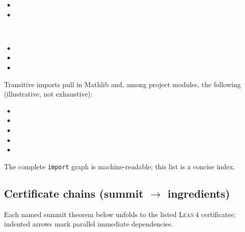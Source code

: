 \documentclass[11pt,a4paper]{article}
\theoremstyle{definition}
\newcommand{\lean}{\textsc{Lean}\,4}
\begin{document}
\begin{description}[style=nextline, font=\normalfont\ttfamily\small]
\begin{itemize}[leftmargin=1.5em,itemsep=0.12em,nosep]
\item {}
\item {}
\end{itemize}
\item[Summits]\mbox{}\\
\begin{itemize}[leftmargin=1.5em,itemsep=0.12em,nosep]
\item {}
\item {}
\item {}
\end{itemize}
\end{description}
\noindent
Transitive imports pull in Mathlib and, among project modules, the following (illustrative, not exhaustive):
\begin{itemize}[leftmargin=2em,itemsep=0.15em,nosep]
\item {}
\item {}
\item {}
\item {}
\item {}
\end{itemize}
The complete \texttt{import} graph is machine-readable; this list is a concise index.

\subsection{Certificate chains (\texorpdfstring{summit $\to$ ingredients}{summit -> ingredients})}

Each named summit theorem below unfolds to the listed \lean{} certificates; indented arrows mark parallel immediate dependencies.
\end{document}
